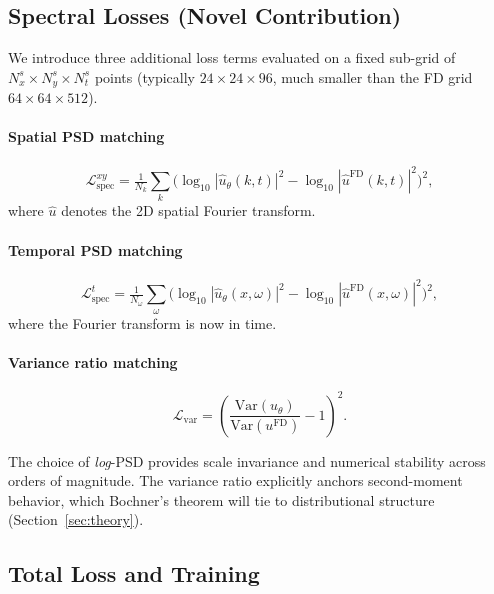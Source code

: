 \documentclass[times,12pt]{elsarticle}
\newcommand{\abs}[1]{\left|#1\right|}
\newcommand{\Var}{\mathrm{Var}}
\begin{document}
\subsection{Spectral Losses (Novel Contribution)}
\label{sec:method-spectral}

We introduce three additional loss terms evaluated on a fixed sub-grid of $N_x^s \times N_y^s \times N_t^s$ points (typically $24 \times 24 \times 96$, much smaller than the FD grid $64 \times 64 \times 512$).

\paragraph{Spatial PSD matching}
\begin{equation}
\mathcal{L}_{\text{spec}}^{xy} = \tfrac{1}{N_k} \sum_k \big(\log_{10} \abs{\hat{u}_\theta(k, t)}^2 - \log_{10} \abs{\hat{u}^{\text{FD}}(k, t)}^2\big)^2,
\label{eq:Lspec-xy}
\end{equation}
where $\hat{u}$ denotes the 2D spatial Fourier transform.

\paragraph{Temporal PSD matching}
\begin{equation}
\mathcal{L}_{\text{spec}}^{t} = \tfrac{1}{N_\omega} \sum_\omega \big(\log_{10} \abs{\hat{u}_\theta(x, \omega)}^2 - \log_{10} \abs{\hat{u}^{\text{FD}}(x, \omega)}^2\big)^2,
\end{equation}
where the Fourier transform is now in time.

\paragraph{Variance ratio matching}
\begin{equation}
\mathcal{L}_{\text{var}} = \left(\frac{\Var(u_\theta)}{\Var(u^{\text{FD}})} - 1\right)^2.
\label{eq:Lvar}
\end{equation}

The choice of \emph{log}-PSD provides scale invariance and numerical stability across orders of magnitude. The variance ratio explicitly anchors second-moment behavior, which Bochner's theorem will tie to distributional structure (Section~\ref{sec:theory}).

\subsection{Total Loss and Training}
\end{document}
